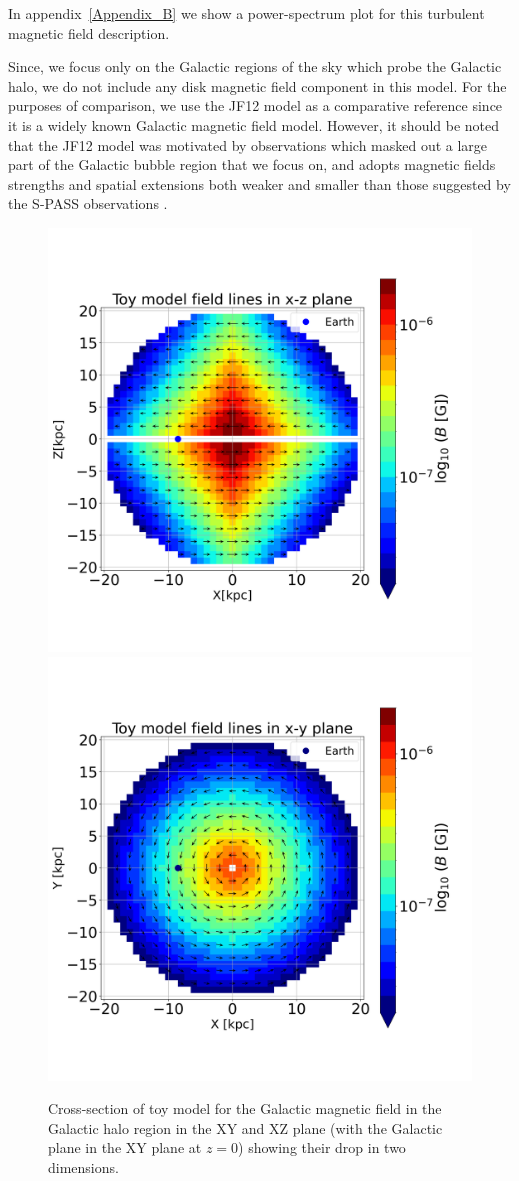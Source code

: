 \documentclass[usenatbib]{mnras}
\begin{document}
In appendix~\ref{Appendix_B} we show a power-spectrum plot for this turbulent magnetic field description.

Since, we focus only on the Galactic regions of the sky which probe the Galactic halo, we do not include any disk magnetic field component in this model. For the purposes of comparison, we use the JF12 model as a comparative reference since it is a widely known Galactic magnetic field model.
However, it should be noted that the JF12 model was motivated by observations which masked out a large part of the Galactic bubble region that we focus on, and adopts magnetic fields strengths and spatial extensions both weaker and smaller than those suggested by the S-PASS observations \cite{Carretti_2013}.
\begin{figure}
\centering
\includegraphics[width = 0.49\linewidth]{Images/ToyModel_BestFit_XZ.png}%
\includegraphics[width = 0.49\linewidth]{Images/ToyModel_BestFit_XY.png}
\caption{Cross-section of toy model for the Galactic magnetic field in the Galactic halo region in the XY and XZ plane (with the Galactic plane in the XY plane at $z=0$) showing their drop in two dimensions.}
\label{fig:Vis_TM}
\end{figure}
\end{document}
